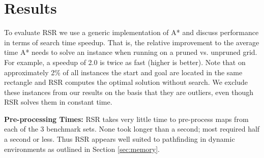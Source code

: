\section{Results}
\label{sec-results}
To evaluate RSR we use a generic implementation of A* and discuss performance 
in terms of search time speedup. That is, the relative improvement to the average 
time A* needs to solve an instance when running on a pruned  vs. unpruned grid.
For example, a speedup of 2.0 is twice as fast (higher is better).
%
Note that on approximately 2\% of all instances the start and goal are located
in the same rectangle and RSR computes the optimal solution without
search.  We exclude these instances from our results on the basis that they are 
outliers, even though RSR solves them in constant time.



\textbf{Pre-processing Times: } 
RSR takes very little time to pre-process maps from each of the 3
benchmark sets.
None took longer than a second; most required half a second or less.
Thus RSR appears well suited to
pathfinding in dynamic environments as outlined in Section \ref{sec:memory}.

